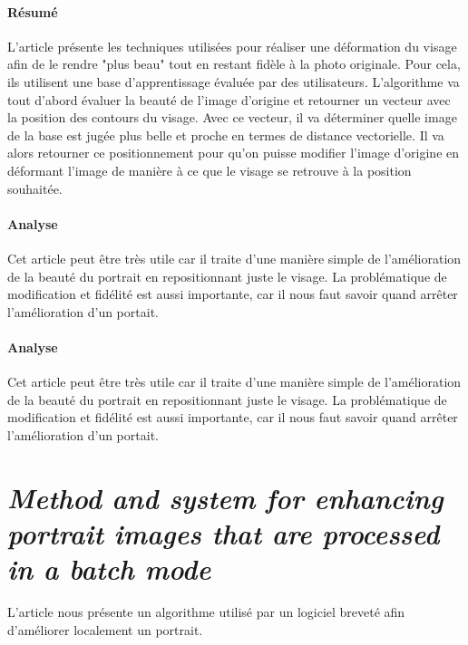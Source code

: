\documentclass[11pt, french,screen]{report-rd-info}
\begin{document}
\paragraph{Résumé}
L'article présente les techniques utilisées pour réaliser une déformation du visage afin de le rendre  "plus beau" tout en restant fidèle à la photo originale. Pour cela, ils utilisent une base d'apprentissage évaluée par des utilisateurs.
L'algorithme va tout d'abord évaluer la beauté de l'image d'origine et retourner un vecteur avec la position des contours du visage. Avec ce vecteur, il va déterminer quelle image de la base est jugée plus belle et proche en termes de distance vectorielle. Il va alors retourner ce positionnement pour qu'on puisse modifier l'image d'origine en déformant l'image de manière à ce que le visage se retrouve à la position souhaitée.
\paragraph{Analyse}
Cet article peut être très utile car il traite d'une manière simple de l'amélioration de la beauté du portrait en repositionnant juste le visage. La problématique de modification et fidélité est aussi importante, car il nous faut savoir quand arrêter l'amélioration d'un portait.
\paragraph{Analyse}
Cet article peut être très utile car il traite d'une manière simple de l'amélioration de la beauté du portrait en repositionnant juste le visage. La problématique de modification et fidélité est aussi importante, car il nous faut savoir quand arrêter l'amélioration d'un portait.
\section{\emph{Method and system for enhancing portrait images that are processed in a batch mode}}
L'article \cite{Matraszek2004} nous présente un algorithme utilisé par un logiciel breveté afin d'améliorer localement un portrait.
\end{document}
